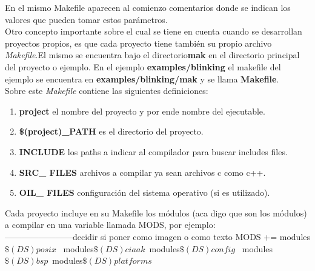 \documentclass[12pt,letterpaper]{article}
\begin{document}
En el mismo Makefile aparecen al comienzo comentarios donde se indican los valores que pueden tomar estos parámetros.\\

Otro concepto importante sobre el cual se tiene en cuenta cuando se desarrollan proyectos propios, es que cada proyecto tiene también su propio archivo \textit{Makefile}.El mismo se encuentra bajo el directorio\textbf{mak} en el directorio principal del proyecto o ejemplo. En el ejemplo \textbf{examples/blinking} el makefile del ejemplo se encuentra en \textbf{examples/blinking/mak} y se llama \textbf{Makefile}.\\

Sobre este \textit{Makefile} contiene las siguientes definiciones:

\begin{enumerate}
\item \textbf{project} el nombre del proyecto y por ende nombre del ejecutable.
\item \textbf{\$(project)\_PATH} es el directorio del proyecto.
\item \textbf{INCLUDE} los paths a indicar al compilador para buscar includes files.
\item \textbf{SRC\_ FILES} archivos a compilar ya sean archivos c como c++.
\item \textbf{OIL\_ FILES} configuración del sistema operativo (si es utilizado).
\end{enumerate}

Cada proyecto incluye en su Makefile los módulos (aca digo que son los módulos) a compilar en una variable llamada MODS, por ejemplo:\\
------------------------decidir si poner como imagen o como texto
MODS += modules$\$(DS)posix$ \
        modules$\$(DS)ciaak $\
        modules$\$(DS)config$ \
        modules$\$(DS)bsp $\
        modules$\$(DS)platforms$\\
\end{document}
